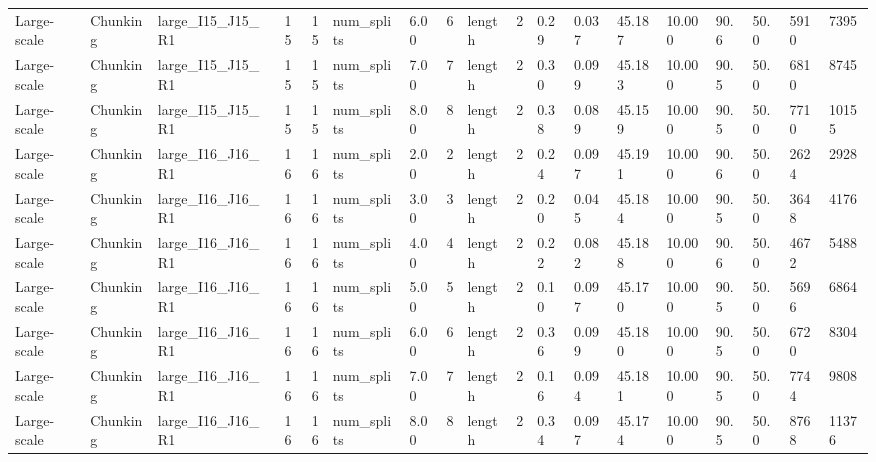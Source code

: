 \begin{longtable}{lllrrllllrllllllll}
Large-scale & Chunking & large\_I15\_J15\_R1 & 15 & 15 & num\_splits & 6.00 & 6 & length & 2 & 0.29 & 0.037 & 45.187 & 10.000 & 90.6 & 50.0 & 5910 & 7395 \\
Large-scale & Chunking & large\_I15\_J15\_R1 & 15 & 15 & num\_splits & 7.00 & 7 & length & 2 & 0.30 & 0.099 & 45.183 & 10.000 & 90.5 & 50.0 & 6810 & 8745 \\
Large-scale & Chunking & large\_I15\_J15\_R1 & 15 & 15 & num\_splits & 8.00 & 8 & length & 2 & 0.38 & 0.089 & 45.159 & 10.000 & 90.5 & 50.0 & 7710 & 10155 \\
Large-scale & Chunking & large\_I16\_J16\_R1 & 16 & 16 & num\_splits & 2.00 & 2 & length & 2 & 0.24 & 0.097 & 45.191 & 10.000 & 90.6 & 50.0 & 2624 & 2928 \\
Large-scale & Chunking & large\_I16\_J16\_R1 & 16 & 16 & num\_splits & 3.00 & 3 & length & 2 & 0.20 & 0.045 & 45.184 & 10.000 & 90.5 & 50.0 & 3648 & 4176 \\
Large-scale & Chunking & large\_I16\_J16\_R1 & 16 & 16 & num\_splits & 4.00 & 4 & length & 2 & 0.22 & 0.082 & 45.188 & 10.000 & 90.6 & 50.0 & 4672 & 5488 \\
Large-scale & Chunking & large\_I16\_J16\_R1 & 16 & 16 & num\_splits & 5.00 & 5 & length & 2 & 0.10 & 0.097 & 45.170 & 10.000 & 90.5 & 50.0 & 5696 & 6864 \\
Large-scale & Chunking & large\_I16\_J16\_R1 & 16 & 16 & num\_splits & 6.00 & 6 & length & 2 & 0.36 & 0.099 & 45.180 & 10.000 & 90.5 & 50.0 & 6720 & 8304 \\
Large-scale & Chunking & large\_I16\_J16\_R1 & 16 & 16 & num\_splits & 7.00 & 7 & length & 2 & 0.16 & 0.094 & 45.181 & 10.000 & 90.5 & 50.0 & 7744 & 9808 \\
Large-scale & Chunking & large\_I16\_J16\_R1 & 16 & 16 & num\_splits & 8.00 & 8 & length & 2 & 0.34 & 0.097 & 45.174 & 10.000 & 90.5 & 50.0 & 8768 & 11376 \\
\end{longtable}
